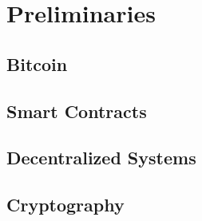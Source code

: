 \documentclass[conference]{IEEEtran}
\begin{document}
\appendices
\section{Preliminaries}
\subsection{Bitcoin}
\subsection{Smart Contracts}
\subsection{Decentralized Systems}
\subsection{Cryptography}
\end{document}
